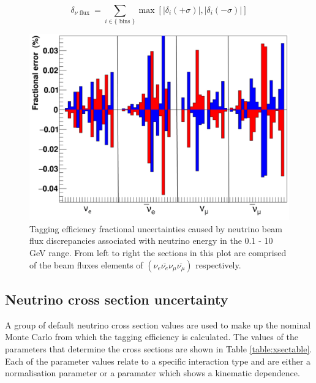 \begin{equation}
    \delta_{\nu \text { flux }}=\sum_{i \in\{\text { bins }\}} \max \left[\left|\delta_{i}(+\sigma)\right|,\left|\delta_{i}(-\sigma)\right|\right]
 \label{eq:summingfluxuncertainty}   
\end{equation}

\begin{figure}[!htb]
    \centering
\includegraphics[width=\textwidth]{Figures/flux_uncertainty.png}
\caption{Tagging efficiency fractional uncertainties caused by neutrino beam flux discrepancies associated with neutrino energy in the 0.1 - 10 GeV range. From left to right the sections in this plot are comprised of the beam fluxes elements of $\left(\nu_{e} \overline{\nu_{e}} \nu_{\mu} \overline{\nu_{\mu}}\right)$ respectively.}
\label{fig:fluxuncertainty}
\end{figure}

\subsection{Neutrino cross section uncertainty}

A group of default neutrino cross section values are used to make up the nominal Monte Carlo from which the tagging efficiency is calculated. The values of the parameters that determine the cross sections are shown in Table \ref{table:xsectable}. Each of the parameter values relate to a specific interaction type and are either a normalisation parameter or a paramater which shows a kinematic dependence. \newline

